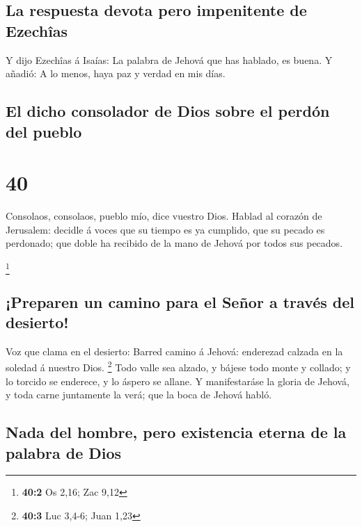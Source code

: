 \hypertarget{la-respuesta-devota-pero-impenitente-de-ezechuxeeas}{%
\subsection{La respuesta devota pero impenitente de
Ezechîas}\label{la-respuesta-devota-pero-impenitente-de-ezechuxeeas}}

 Y dijo Ezechîas á Isaías: La palabra de Jehová que has
hablado, es buena. Y añadió: A lo menos, haya paz y verdad en mis días.

\hypertarget{el-dicho-consolador-de-dios-sobre-el-perduxf3n-del-pueblo}{%
\subsection{El dicho consolador de Dios sobre el perdón del
pueblo}\label{el-dicho-consolador-de-dios-sobre-el-perduxf3n-del-pueblo}}

\hypertarget{section-39}{%
\section{40}\label{section-39}}

 Consolaos, consolaos, pueblo mío, dice vuestro Dios.
 Hablad al corazón de Jerusalem: decidle á voces que su
tiempo es ya cumplido, que su pecado es perdonado; que doble ha recibido
de la mano de Jehová por todos sus pecados.

\footnote{\textbf{40:2} Os 2,16; Zac 9,12}

\hypertarget{preparen-un-camino-para-el-seuxf1or-a-travuxe9s-del-desierto}{%
\subsection{¡Preparen un camino para el Señor a través del
desierto!}\label{preparen-un-camino-para-el-seuxf1or-a-travuxe9s-del-desierto}}

 Voz que clama en el desierto: Barred camino á Jehová:
enderezad calzada en la soledad á nuestro Dios. \footnote{\textbf{40:3}
  Luc 3,4-6; Juan 1,23}  Todo valle sea alzado, y bájese
todo monte y collado; y lo torcido se enderece, y lo áspero se allane.
 Y manifestaráse la gloria de Jehová, y toda carne
juntamente la verá; que la boca de Jehová habló.

\hypertarget{nada-del-hombre-pero-existencia-eterna-de-la-palabra-de-dios}{%
\subsection{Nada del hombre, pero existencia eterna de la palabra de
Dios}\label{nada-del-hombre-pero-existencia-eterna-de-la-palabra-de-dios}}

